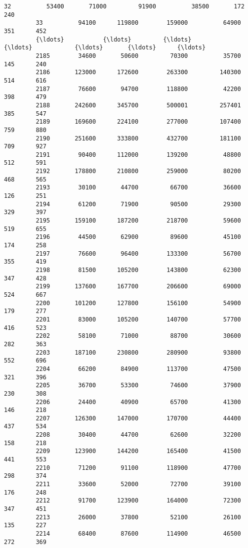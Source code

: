 \documentclass[11pt]{llncs}
\begin{document}
\begin{Verbatim}[commandchars=\\\{\}]
         32          53400       71000         91900          38500       172      240   
         33          94100      119800        159000          64900       351      452   
         {\ldots}           {\ldots}         {\ldots}           {\ldots}            {\ldots}       {\ldots}      {\ldots}   
         2185        34600       50600         70300          35700       145      240   
         2186       123000      172600        263300         140300       514      616   
         2187        76600       94700        118800          42200       398      479   
         2188       242600      345700        500001         257401       385      547   
         2189       169600      224100        277000         107400       759      880   
         2190       251600      333800        432700         181100       709      927   
         2191        90400      112000        139200          48800       512      591   
         2192       178800      210800        259000          80200       468      565   
         2193        30100       44700         66700          36600       126      251   
         2194        61200       71900         90500          29300       329      397   
         2195       159100      187200        218700          59600       519      655   
         2196        44500       62900         89600          45100       174      258   
         2197        76600       96400        133300          56700       355      419   
         2198        81500      105200        143800          62300       347      428   
         2199       137600      167700        206600          69000       524      667   
         2200       101200      127800        156100          54900       179      277   
         2201        83000      105200        140700          57700       416      523   
         2202        58100       71000         88700          30600       282      363   
         2203       187100      230800        280900          93800       552      696   
         2204        66200       84900        113700          47500       321      396   
         2205        36700       53300         74600          37900       230      308   
         2206        24400       40900         65700          41300       146      218   
         2207       126300      147000        170700          44400       437      534   
         2208        30400       44700         62600          32200       158      218   
         2209       123900      144200        165400          41500       441      553   
         2210        71200       91100        118900          47700       298      374   
         2211        33600       52000         72700          39100       176      248   
         2212        91700      123900        164000          72300       347      451   
         2213        26000       37800         52100          26100       135      227   
         2214        68400       87600        114900          46500       272      369   
         

\end{Verbatim}
\end{document}
